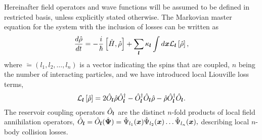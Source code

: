 Hereinafter field operators and wave functions will be assumed to be defined in restricted basis, unless explicitly stated otherwise.
The Markovian master equation for the system with the inclusion of losses can be written as~\cite{Jack2002}
\begin{equation}
	\frac{d\hat{\rho}}{dt} =
		- \frac{i}{\hbar} \left[ \hat{H}, \hat{\rho} \right]
		+ \sum\limits_{\boldsymbol{l}} \kappa_{\boldsymbol{l}} \int d\boldsymbol{x}
			\mathcal{L}_{\boldsymbol{l}} \left[ \hat{\rho} \right],
\end{equation}
where $\lvec = (l_1, l_2, \ldots, l_n)$ is a vector indicating the spins that are coupled,
$n$ being the number of interacting particles,
and we have introduced local Liouville loss terms,
\begin{equation}
	\mathcal{L}_{\boldsymbol{l}} \left[ \hat{\rho} \right] =
		2\hat{O}_{\boldsymbol{l}} \hat{\rho} \hat{O}_{\boldsymbol{l}}^\dagger
		- \hat{O}_{\boldsymbol{l}}^\dagger \hat{O}_{\boldsymbol{l}} \hat{\rho}
		- \hat{\rho} \hat{O}_{\boldsymbol{l}}^\dagger \hat{O}_{\boldsymbol{l}}.
\end{equation}
The reservoir coupling operators $\hat{O}_{\boldsymbol{l}}$ are the distinct $n$-fold products of local field annihilation operators,
$\hat{O}_{\boldsymbol{l}} = \hat{O}_{\boldsymbol{l}} (\hat{\boldsymbol{\Psi}}) =
	\hat{\Psi}_{l_{1}} (\boldsymbol{x})
	\hat{\Psi}_{l_{2}} (\boldsymbol{x}) \ldots
	\hat{\Psi}_{l_{n}} (\boldsymbol{x}),$
describing local $n$-body collision losses.

